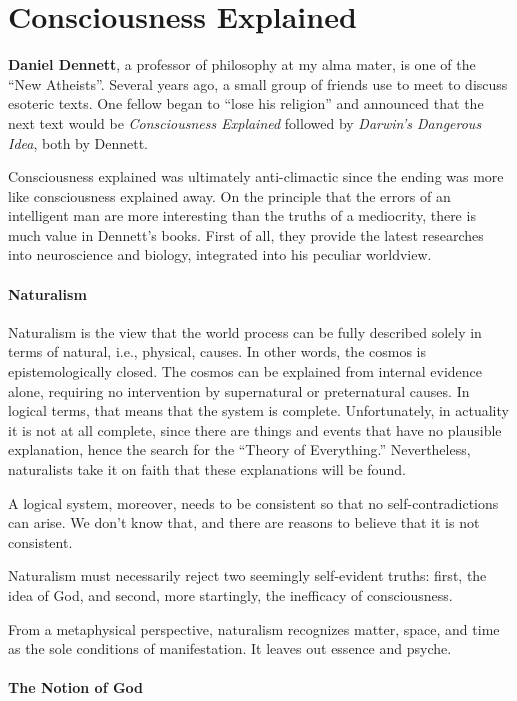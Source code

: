 \section{Consciousness Explained}

\textbf{Daniel Dennett}, a professor of philosophy at my alma mater, is one of the ``New Atheists''. Several years ago, a small group of friends use to meet to discuss esoteric texts. One fellow began to ``lose his religion'' and announced that the next text would be \emph{Consciousness Explained} followed by \emph{Darwin's Dangerous Idea}, both by Dennett.

Consciousness explained was ultimately anti-climactic since the ending was more like consciousness explained away. On the principle that the errors of an intelligent man are more interesting than the truths of a mediocrity, there is much value in Dennett's books. First of all, they provide the latest researches into neuroscience and biology, integrated into his peculiar worldview.

\paragraph{Naturalism}


Naturalism is the view that the world process can be fully described solely in terms of natural, i.e., physical, causes. In other words, the cosmos is epistemologically closed. The cosmos can be explained from internal evidence alone, requiring no intervention by supernatural or preternatural causes. In logical terms, that means that the system is complete. Unfortunately, in actuality it is not at all complete, since there are things and events that have no plausible explanation, hence the search for the ``Theory of Everything.'' Nevertheless, naturalists take it on faith that these explanations will be found.

A logical system, moreover, needs to be consistent so that no self-contradictions can arise. We don't know that, and there are reasons to believe that it is not consistent.

Naturalism must necessarily reject two seemingly self-evident truths: first, the idea of God, and second, more startingly, the inefficacy of consciousness.

From a metaphysical perspective, naturalism recognizes matter, space, and time as the sole conditions of manifestation. It leaves out essence and psyche.

\paragraph{The Notion of God}


